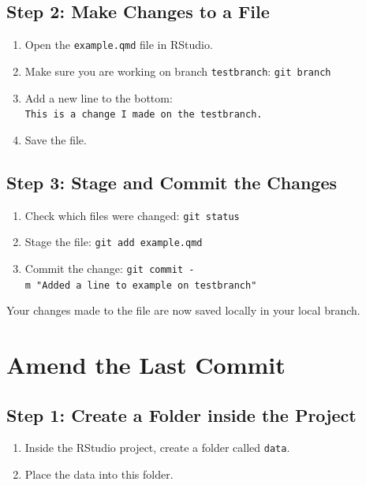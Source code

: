 \documentclass[
  11pt,
  letterpaper,
  DIV=11,
  numbers=noendperiod]{scrartcl}
\providecommand{\tightlist}{%
  \setlength{\itemsep}{0pt}\setlength{\parskip}{0pt}}\usepackage{longtable,booktabs,array}
\let\textttOrig\texttt
\renewcommand{\texttt}[1]{\textttOrig{\colorbox{codebggray}{\textcolor{codefontcolor}{#1}}}}
\begin{document}
\subsection{Step 2: Make Changes to a
File}\label{step-2-make-changes-to-a-file}

\begin{enumerate}
\def\labelenumi{\arabic{enumi}.}
\tightlist
\item
  Open the \texttt{example.qmd} file in RStudio.
\item
  Make sure you are working on branch \texttt{testbranch}:
  \texttt{git\ branch}
\item
  Add a new line to the bottom:
  \texttt{This\ is\ a\ change\ I\ made\ on\ the\ testbranch.}
\item
  Save the file.
\end{enumerate}

\subsection{Step 3: Stage and Commit the
Changes}\label{step-3-stage-and-commit-the-changes}

\begin{enumerate}
\def\labelenumi{\arabic{enumi}.}
\tightlist
\item
  Check which files were changed: \texttt{git\ status}
\item
  Stage the file: \texttt{git\ add\ example.qmd}
\item
  Commit the change:
  \texttt{git\ commit\ -m\ "Added\ a\ line\ to\ example\ on\ testbranch"}
\end{enumerate}

Your changes made to the file are now saved locally in your local
branch.

\newpage

\section{Amend the Last Commit}\label{amend-the-last-commit}

\subsection{Step 1: Create a Folder inside the
Project}\label{step-1-create-a-folder-inside-the-project}

\begin{enumerate}
\def\labelenumi{\arabic{enumi}.}
\tightlist
\item
  Inside the RStudio project, create a folder called \texttt{data}.
\item
  Place the data into this folder.
\end{enumerate}
\end{document}
